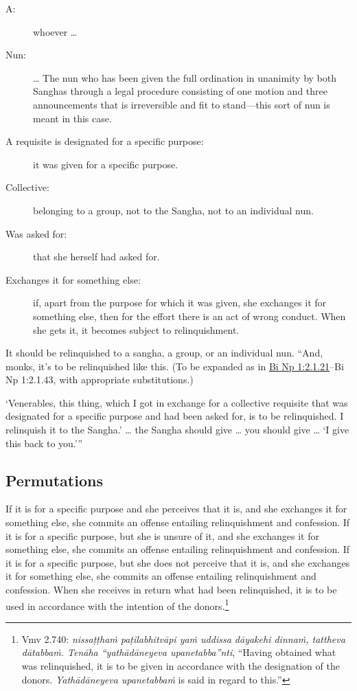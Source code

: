 \documentclass[12pt,openany]{book}%
\begin{document}
\begin{description}%
\item[A: ] whoever … %
\item[Nun: ] … The nun who has been given the full ordination in unanimity by both Sanghas through a legal procedure consisting of one motion and three announcements that is irreversible and fit to stand—this sort of nun is meant in this case. %
\item[A requisite is designated for a specific purpose: ] it was given for a specific purpose. %
\item[Collective: ] belonging to a group, not to the Sangha, not to an individual nun. %
\item[Was asked for: ] that she herself had asked for. %
\item[Exchanges it for something else: ] if, apart from the purpose for which it was given, she exchanges it for something else, then for the effort there is an act of wrong conduct. When she gets it, it becomes subject to relinquishment. %
\end{description}

It should be relinquished to a sangha, a group, or an individual nun. “And, monks, it’s to be relinquished like this.  (To be expanded as in \href{https://suttacentral.net/pli-tv-bi-vb-np1/en/brahmali\#2.1.21}{Bi Np 1:2.1.21}–Bi Np 1:2.1.43, with appropriate substitutions.) 

‘Venerables, this thing, which I got in exchange for a collective requisite that was designated for a specific purpose and had been asked for, is to be relinquished. I relinquish it to the Sangha.’ … the Sangha should give … you should give … ‘I give this back to you.’” 

\subsection*{Permutations }

If it is for a specific purpose and she perceives that it is, and she exchanges it for something else, she commits an offense entailing relinquishment and confession. If it is for a specific purpose, but she is unsure of it, and she exchanges it for something else, she commits an offense entailing relinquishment and confession. If it is for a specific purpose, but she does not perceive that it is, and she exchanges it for something else, she commits an offense entailing relinquishment and confession. When she receives in return what had been relinquished, it is to be used in accordance with the intention of the donors.\footnote{Vmv 2.740: \textit{\textsanskrit{nissaṭṭhaṁ} \textsanskrit{paṭilabhitvāpi} \textsanskrit{yaṁ} uddissa \textsanskrit{dāyakehi} \textsanskrit{dinnaṁ}, tattheva \textsanskrit{dātabbaṁ}. \textsanskrit{Tenāha} “\textsanskrit{yathādāneyeva} upanetabba”nti}, “Having obtained what was relinquished, it is to be given in accordance with the designation of the donors. \textit{\textsanskrit{Yathādāneyeva} \textsanskrit{upanetabbaṁ}} is said in regard to this.” } 
\end{document}
